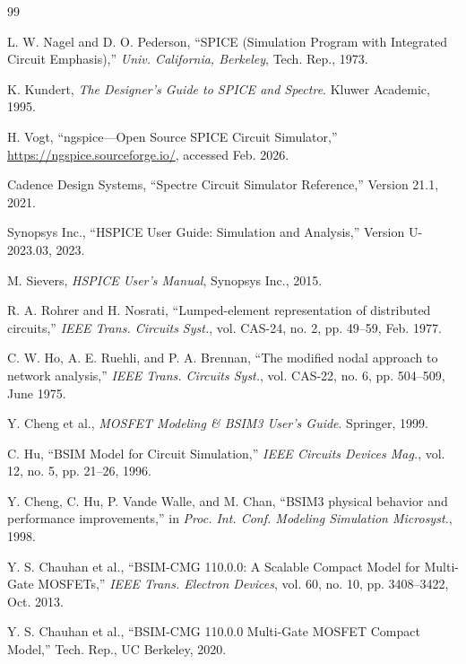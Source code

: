 \documentclass[10pt,twocolumn]{article}
\begin{document}
\balance

\begin{thebibliography}{99}

L. W. Nagel and D. O. Pederson, ``SPICE (Simulation Program with Integrated Circuit Emphasis),''
\textit{Univ. California, Berkeley}, Tech. Rep., 1973.

K. Kundert, \textit{The Designer's Guide to SPICE and Spectre}.
Kluwer Academic, 1995.

H. Vogt, ``ngspice---Open Source SPICE Circuit Simulator,'' 
\url{https://ngspice.sourceforge.io/}, accessed Feb. 2026.

Cadence Design Systems, ``Spectre Circuit Simulator Reference,''
Version 21.1, 2021.

Synopsys Inc., ``HSPICE User Guide: Simulation and Analysis,''
Version U-2023.03, 2023.

M. Sievers, \textit{HSPICE User's Manual}, Synopsys Inc., 2015.

R. A. Rohrer and H. Nosrati, ``Lumped-element representation of distributed circuits,''
\textit{IEEE Trans. Circuits Syst.}, vol. CAS-24, no. 2, pp. 49--59, Feb. 1977.

C. W. Ho, A. E. Ruehli, and P. A. Brennan, ``The modified nodal approach to network analysis,''
\textit{IEEE Trans. Circuits Syst.}, vol. CAS-22, no. 6, pp. 504--509, June 1975.

Y. Cheng et al., \textit{MOSFET Modeling \& BSIM3 User's Guide}. 
Springer, 1999.

C. Hu, ``BSIM Model for Circuit Simulation,'' 
\textit{IEEE Circuits Devices Mag.}, vol. 12, no. 5, pp. 21--26, 1996.

Y. Cheng, C. Hu, P. Vande Walle, and M. Chan, ``BSIM3 physical behavior and performance improvements,''
in \textit{Proc. Int. Conf. Modeling Simulation Microsyst.}, 1998.

Y. S. Chauhan et al., ``BSIM-CMG 110.0.0: A Scalable Compact Model for Multi-Gate MOSFETs,''
\textit{IEEE Trans. Electron Devices}, vol. 60, no. 10, pp. 3408--3422, Oct. 2013.

Y. S. Chauhan et al., ``BSIM-CMG 110.0.0 Multi-Gate MOSFET Compact Model,''
Tech. Rep., UC Berkeley, 2020.


\end{thebibliography}
\end{document}
